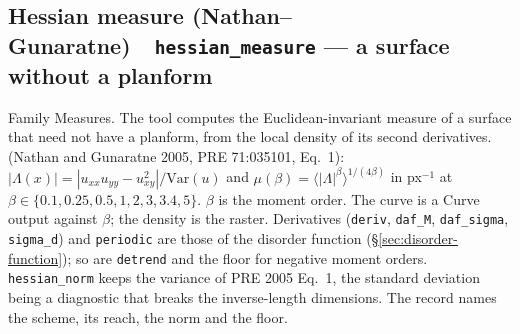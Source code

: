 \documentclass[10pt]{article}
\newcommand{\dev}[1]{\texttt{#1}}
\newcommand{\tool}[2]{#1~\textperiodcentered~\dev{#2}}
\begin{document}
\subsection{\tool{Hessian measure (Nathan--Gunaratne)}{hessian\_measure} --- a surface without a planform}\label{sec:hessian-measure}
Family Measures. The tool computes the
Euclidean-invariant measure of a surface that need not have a planform, from the local density of its
second derivatives. (Nathan and Gunaratne 2005, PRE 71:035101, Eq.~1): $|\Lambda(x)| = |u_{xx}u_{yy} -
u_{xy}^2| / \mathrm{Var}(u)$ and $\mu(\beta) = \langle|\Lambda|^\beta\rangle^{1/(4\beta)}$ in
px$^{-1}$ at $\beta \in \{0.1, 0.25, 0.5, 1, 2, 3, 3.4, 5\}$. $\beta$ is the moment order. The curve is a Curve output against $\beta$; the density is the raster.
Derivatives (\texttt{deriv}, \texttt{daf\_M}, \texttt{daf\_sigma}, \texttt{sigma\_d}) and
\texttt{periodic} are those of the disorder function (\S\ref{sec:disorder-function}); so are
\texttt{detrend} and the floor for negative moment orders. \texttt{hessian\_norm} keeps the variance of
PRE 2005 Eq.~1, the standard deviation being a diagnostic that breaks the inverse-length dimensions.
The record names the scheme, its reach, the norm and the floor.
\end{document}
